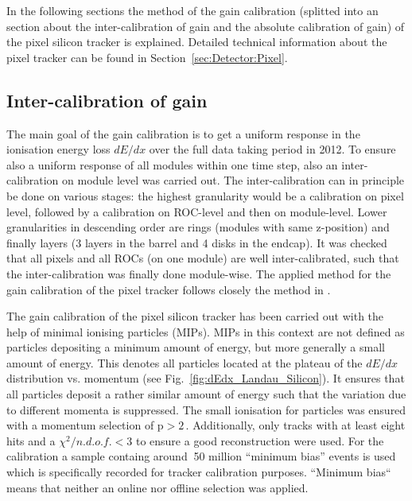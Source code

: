 In the following sections the method of the gain calibration (splitted into an section about the inter-calibration of gain and the absolute calibration of gain) of the pixel silicon tracker is explained. 
Detailed technical information about the pixel tracker can be found in Section~\ref{sec:Detector:Pixel}.


\subsection*{Inter-calibration of gain}
The main goal of the gain calibration is to get a uniform response in the ionisation energy loss $dE/dx$ over the full data taking period in 2012.
To ensure also a uniform response of all modules within one time step, also an inter-calibration on module level was carried out.
The inter-calibration can in principle be done on various stages: the highest granularity would be a calibration on pixel level, followed by a calibration on ROC-level and then on module-level.
Lower granularities in descending order are rings (modules with same z-position) and finally layers (3 layers in the barrel and 4 disks in the endcap). 
It was checked that all pixels and all ROCs (on one module) are well inter-calibrated, such that the inter-calibration was finally done module-wise.
The applied method for the gain calibration of the pixel tracker follows closely the method in \cite{bib:Quertenmont_2010}.

The gain calibration of the pixel silicon tracker has been carried out with the help of minimal ionising particles (MIPs).
MIPs in this context are not defined as particles depositing a minimum amount of energy, but more generally a small amount of energy.
This denotes all particles located at the plateau of the $dE/dx$ distribution vs. momentum (see Fig.~\ref{fig:dEdx_Landau_Silicon}).
It ensures that all particles deposit a rather similar amount of energy such that the variation due to different momenta is suppressed.
The small ionisation for particles was ensured with a momentum selection of $\text{p}>2\,$\gev.
Additionally, only tracks with at least eight hits and a $\chi^2/n.d.o.f.<3$ to ensure a good reconstruction were used.
For the calibration a sample containg around $~$50 million ``minimum bias'' events is used which is specifically recorded for tracker calibration purposes.
``Minimum bias`` means that neither an online nor offline selection was applied.

